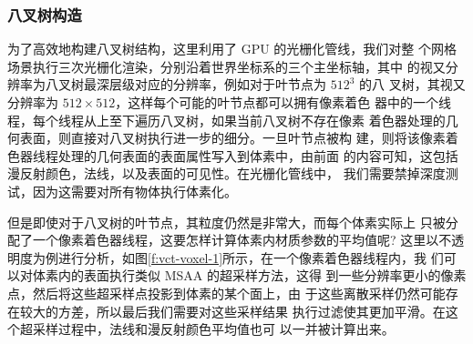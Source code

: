 \subsubsection{八叉树构造}
为了高效地构建八叉树结构，这里利用了 GPU 的光栅化管线，我们对整 个网格场景执行三次光栅化渲染，分别沿着世界坐标系的三个主坐标轴，其中 的视又分辨率为八叉树最深层级对应的分辨率，例如对于叶节点为 $512^{3}$ 的八 叉树，其视又分辨率为 $512\times  512$，这样每个可能的叶节点都可以拥有像素着色 器中的一个线程，每个线程从上至下遍历八叉树，如果当前八叉树不存在像素 着色器处理的几何表面，则直接对八叉树执行进一步的细分。一旦叶节点被构 建，则将该像素着色器线程处理的几何表面的表面属性写入到体素中，由前面 的内容可知，这包括漫反射颜色，法线，以及表面的可见性。在光栅化管线中， 我们需要禁掉深度测试，因为这需要对所有物体执行体素化。

但是即使对于八叉树的叶节点，其粒度仍然是非常大，而每个体素实际上 只被分配了一个像素着色器线程，这要怎样计算体素内材质参数的平均值呢? 这里以不透明度为例进行分析，如图\ref{f:vct-voxel-1}所示，在一个像素着色器线程内，我 们可以对体素内的表面执行类似 MSAA 的超采样方法\cite{a:Practicalreal-timevoxelbasedglobalilluminationforcurrentgpus}，这得 到一些分辨率更小的像素点，然后将这些超采样点投影到体素的某个面上，由 于这些离散采样仍然可能存在较大的方差，所以最后我们需要对这些采样结果 执行过滤使其更加平滑。在这个超采样过程中，法线和漫反射颜色平均值也可 以一并被计算出来。

